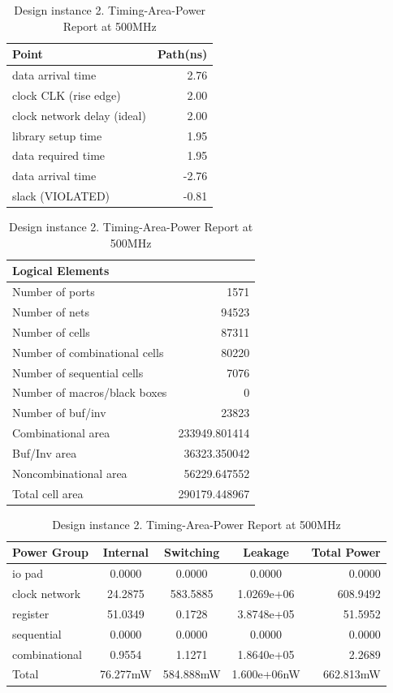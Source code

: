 \documentclass[journal,comsoc]{IEEEtran}
\begin{document}
\begin{table} 
	\centering
	\caption{Design instance 2. Timing-Area-Power Report at 500MHz}	
	\begin{tabular}{@{}lr@{}}
		Point 						&Path(ns)\\
		\hline\hline
		data arrival time   		&2.76\\ 
		clock CLK (rise edge)  		&2.00\\
		clock network delay (ideal) &2.00\\
		library setup time			&1.95\\
		\hline
		data required time			&1.95\\
		data arrival time           &-2.76\\
		\hline
		slack (VIOLATED)            &-0.81\\	
		\hline
	\end{tabular}
	
	\begin{tabular}{@{}lr@{}}\\
		Logical Elements\\
		\hline\hline
		Number of ports                &1571\\
		Number of nets                 &94523\\
		Number of cells                &87311\\
		Number of combinational cells  &80220\\
		Number of sequential cells     &7076\\
		Number of macros/black boxes   &0\\
		Number of buf/inv              &23823\\
		\hline
		Combinational area             &233949.801414\\
		Buf/Inv area                   &36323.350042\\
		Noncombinational area          &56229.647552\\
		\hline
		Total cell area                &290179.448967\\	
		\hline
	\end{tabular}
	
	\begin{tabular}{@{}lcccr@{}}\\
		Power Group		 &Internal 	&Switching 	&Leakage		&Total Power\\
		\hline\hline
		io pad           &0.0000    &0.0000     &0.0000    		&0.0000\\
		clock network    &24.2875   &583.5885   &1.0269e+06 	&608.9492\\
		register         &51.0349   &0.1728     &3.8748e+05 	&51.5952\\  
		sequential       &0.0000    &0.0000     &0.0000     	&0.0000\\  
		combinational    &0.9554    &1.1271     &1.8640e+05 	&2.2689\\ 
		\hline
		Total            &76.277mW  &584.888mW  &1.600e+06nW	&662.813mW\\	
		\hline
	\end{tabular}
	\label{tab:rep_desgin2}
\end{table}
\end{document}

